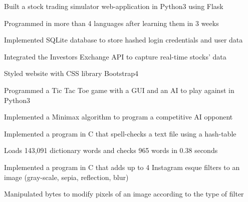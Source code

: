 \documentclass[]{deedy-resume-openfont}
\begin{document}
\begin{minipage}[t]{0.66\textwidth}
    \begin{tightemize}
        \item Built a stock trading simulator web-application in Python3 using Flask
        \item Programmed in more than 4 languages after learning them in 3 weeks
        \item Implemented SQLite database to store hashed login credentials and user data
        \item Integrated the Investors Exchange API to capture real-time stocks' data
        \item Styled website with CSS library Bootstrap4
    \end{tightemize}
    \sectionsep

    \begin{tightemize}
        \item Programmed a Tic Tac Toe game with a GUI and an AI to play against in Python3
        \item Implemented a Minimax algorithm to program a competitive AI opponent
    \end{tightemize}
    \sectionsep

    \begin{tightemize}
        \item Implemented a program in C that spell-checks a text file using a hash-table
        \item Loads 143,091 dictionary words and checks 965 words in 0.38 seconds
    \end{tightemize}
    \sectionsep

    \begin{tightemize}
        \item Implemented a program in C that adds up to 4 Instagram esque filters to an image (gray-scale, sepia, reflection, blur)
        \item Manipulated bytes to modify pixels of an image according to the type of filter
    \end{tightemize}
    \sectionsep


\end{minipage}
\end{document}
